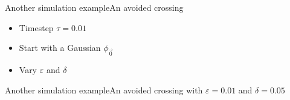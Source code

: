 \documentclass{beamer}
\begin{document}
\begin{frame}{Another simulation example}{An avoided crossing}
\begin{itemize}
\begin{align*}
      \quad
      \mat{Q} = \begin{pmatrix}
        1 & 0 \\ 0 & 1
      \end{pmatrix}
      \quad
      \mat{P} = \begin{pmatrix}
        i & 0 \\ 0 & i
      \end{pmatrix}
      \quad
      S = 0
    \end{align*}
  \item Timestep $\tau = 0.01$
  \item Start with a Gaussian $\phi_{\vec{0}}$
  \item Vary $\varepsilon$ and $\delta$
  \end{itemize}
\end{frame}


\begin{frame}{Another simulation example}{An avoided crossing with $\varepsilon=0.01$ and $\delta=0.05$}
  \begin{figure}
    \centering
  \end{figure}
\end{frame}
\end{document}
